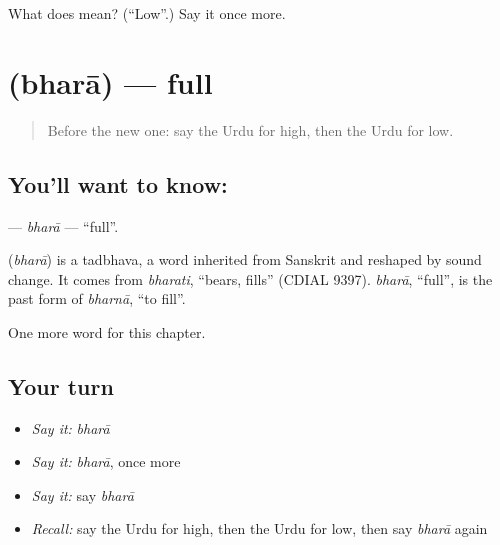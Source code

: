\begin{tcolorbox}[breakable,colback=teal!4,colframe=teal!35!black,title={Before you move on}]
What does  mean? (\textquotedblleft{}Low\textquotedblright{}.) Say it once more.
\end{tcolorbox}
\section[\texorpdfstring{\ur{بھرا} (bharā)}{بھرا (bharā)}]{ (bharā) — full}

\label{lesson:UR-C72-bhara}



\begin{quote}
Before the new one: say the Urdu for high, then the Urdu for low.
\end{quote}

\subsection*{You'll want to know: }
\textbf{} — \emph{bharā} — \textquotedblleft{}full\textquotedblright{}.

\begin{cousinweb}
\textbf{} (\emph{bharā}) is a tadbhava, a word inherited from Sanskrit and reshaped by sound change. It comes from \emph{bharati}, \textquotedblleft{}bears, fills\textquotedblright{} (CDIAL 9397). \emph{bharā}, \textquotedblleft{}full\textquotedblright{}, is the past form of \emph{bharnā}, \textquotedblleft{}to fill\textquotedblright{}.
\end{cousinweb}

\begin{grammarlens}[title={What you've built}]
One more word for this chapter.
\end{grammarlens}

\subsection*{Your turn}
\begin{itemize}
\raggedright
  \item \emph{Say it:} \emph{bharā}
  \item \emph{Say it:} \emph{bharā}, once more
  \item \emph{Say it:} say \emph{bharā}
  \item \emph{Recall:} say the Urdu for high, then the Urdu for low, then say \emph{bharā} again
\end{itemize}

